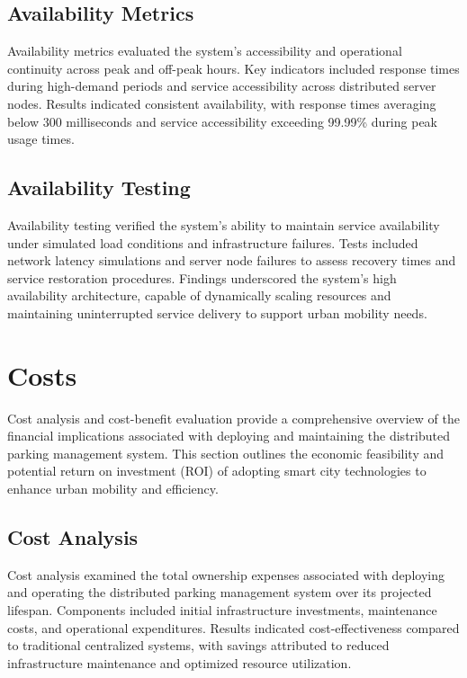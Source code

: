 \documentclass[oneside, 12pt, a4paper, draft]{book}
\begin{document}
\section{Availability Metrics}
\label{sec:orgc6d59f5}

Availability metrics evaluated the system's accessibility and operational continuity across peak and off-peak hours. Key indicators included response times during high-demand periods and service accessibility across distributed server nodes. Results indicated consistent availability, with response times averaging below 300 milliseconds and service accessibility exceeding 99.99\% during peak usage times.
\section{Availability Testing}
\label{sec:org5c1231b}

Availability testing verified the system's ability to maintain service availability under simulated load conditions and infrastructure failures. Tests included network latency simulations and server node failures to assess recovery times and service restoration procedures. Findings underscored the system's high availability architecture, capable of dynamically scaling resources and maintaining uninterrupted service delivery to support urban mobility needs.
\chapter{Costs}
\label{sec:orga48bb7f}
Cost analysis and cost-benefit evaluation provide a comprehensive overview of the financial implications associated with deploying and maintaining the distributed parking management system. This section outlines the economic feasibility and potential return on investment (ROI) of adopting smart city technologies to enhance urban mobility and efficiency.
\section{Cost Analysis}
\label{sec:org917e3f4}

Cost analysis examined the total ownership expenses associated with deploying and operating the distributed parking management system over its projected lifespan. Components included initial infrastructure investments, maintenance costs, and operational expenditures. Results indicated cost-effectiveness compared to traditional centralized systems, with savings attributed to reduced infrastructure maintenance and optimized resource utilization.
\end{document}
